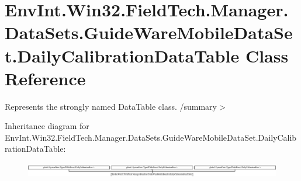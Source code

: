 \hypertarget{class_env_int_1_1_win32_1_1_field_tech_1_1_manager_1_1_data_sets_1_1_guide_ware_mobile_data_set_5b380d875f3f569d74f6183f0c2ee8d7}{}\section{Env\+Int.\+Win32.\+Field\+Tech.\+Manager.\+Data\+Sets.\+Guide\+Ware\+Mobile\+Data\+Set.\+Daily\+Calibration\+Data\+Table Class Reference}
\label{class_env_int_1_1_win32_1_1_field_tech_1_1_manager_1_1_data_sets_1_1_guide_ware_mobile_data_set_5b380d875f3f569d74f6183f0c2ee8d7}


Represents the strongly named Data\+Table class. /summary$>$  


Inheritance diagram for Env\+Int.\+Win32.\+Field\+Tech.\+Manager.\+Data\+Sets.\+Guide\+Ware\+Mobile\+Data\+Set.\+Daily\+Calibration\+Data\+Table\+:\begin{figure}[H]
\begin{center}
\leavevmode
\includegraphics[height=0.663114cm]{class_env_int_1_1_win32_1_1_field_tech_1_1_manager_1_1_data_sets_1_1_guide_ware_mobile_data_set_5b380d875f3f569d74f6183f0c2ee8d7}
\end{center}
\end{figure}
